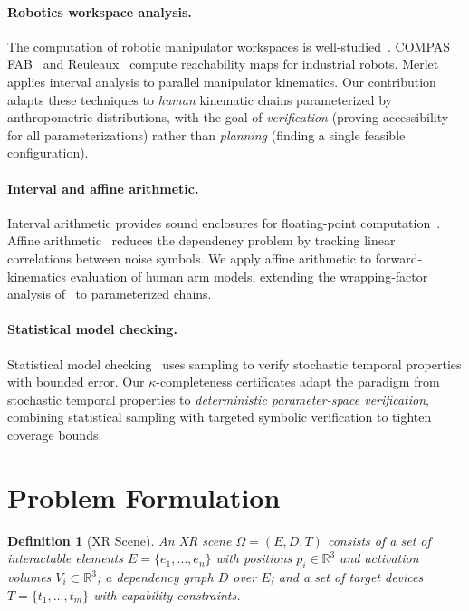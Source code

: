 \documentclass[11pt,letterpaper]{article}
\newtheorem{definition}[theorem]{Definition}
\newcommand{\R}{\mathbb{R}}
\newcommand{\scene}{\Omega}
\begin{document}
\paragraph{Robotics workspace analysis.}
The computation of robotic manipulator workspaces is well-studied~\cite{murray1994}.
COMPAS FAB~\cite{compasfab} and Reuleaux~\cite{reuleaux} compute reachability maps for industrial robots.
Merlet~\cite{merlet2004} applies interval analysis to parallel manipulator kinematics.
Our contribution adapts these techniques to \emph{human} kinematic chains parameterized by anthropometric distributions, with the goal of \emph{verification} (proving accessibility for all parameterizations) rather than \emph{planning} (finding a single feasible configuration).

\paragraph{Interval and affine arithmetic.}
Interval arithmetic provides sound enclosures for floating-point computation~\cite{moore1966}.
Affine arithmetic~\cite{stolfi1997} reduces the dependency problem by tracking linear correlations between noise symbols.
We apply affine arithmetic to forward-kinematics evaluation of human arm models, extending the wrapping-factor analysis of~\cite{merlet2004} to parameterized chains.

\paragraph{Statistical model checking.}
Statistical model checking~\cite{younes2006,legay2010} uses sampling to verify stochastic temporal properties with bounded error.
Our $\kappa$-completeness certificates adapt the paradigm from stochastic temporal properties to \emph{deterministic parameter-space verification}, combining statistical sampling with targeted symbolic verification to tighten coverage bounds.

\section{Problem Formulation}
\label{sec:problem}

\begin{definition}[XR Scene]
An XR scene $\scene = (E, D, T)$ consists of a set of interactable elements $E = \{e_1, \ldots, e_n\}$ with positions $p_i \in \R^3$ and activation volumes $V_i \subset \R^3$; a dependency graph $D$ over $E$; and a set of target devices $T = \{t_1, \ldots, t_m\}$ with capability constraints.
\end{definition}
\end{document}
